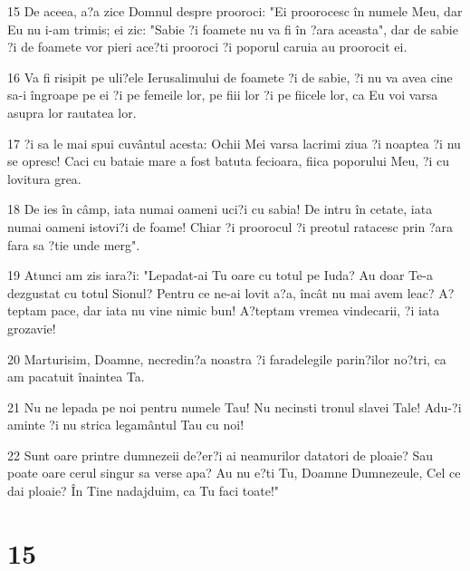 \par 15 De aceea, a?a zice Domnul despre prooroci: "Ei proorocesc în numele Meu, dar Eu nu i-am trimis; ei zic: "Sabie ?i foamete nu va fi în ?ara aceasta", dar de sabie ?i de foamete vor pieri ace?ti prooroci ?i poporul caruia au proorocit ei.
\par 16 Va fi risipit pe uli?ele Ierusalimului de foamete ?i de sabie, ?i nu va avea cine sa-i îngroape pe ei ?i pe femeile lor, pe fiii lor ?i pe fiicele lor, ca Eu voi varsa asupra lor rautatea lor.
\par 17 ?i sa le mai spui cuvântul acesta: Ochii Mei varsa lacrimi ziua ?i noaptea ?i nu se opresc! Caci cu bataie mare a fost batuta fecioara, fiica poporului Meu, ?i cu lovitura grea.
\par 18 De ies în câmp, iata numai oameni uci?i cu sabia! De intru în cetate, iata numai oameni istovi?i de foame! Chiar ?i proorocul ?i preotul ratacesc prin ?ara fara sa ?tie unde merg".
\par 19 Atunci am zis iara?i: "Lepadat-ai Tu oare cu totul pe Iuda? Au doar Te-a dezgustat cu totul Sionul? Pentru ce ne-ai lovit a?a, încât nu mai avem leac? A?teptam pace, dar iata nu vine nimic bun! A?teptam vremea vindecarii, ?i iata grozavie!
\par 20 Marturisim, Doamne, necredin?a noastra ?i faradelegile parin?ilor no?tri, ca am pacatuit înaintea Ta.
\par 21 Nu ne lepada pe noi pentru numele Tau! Nu necinsti tronul slavei Tale! Adu-?i aminte ?i nu strica legamântul Tau cu noi!
\par 22 Sunt oare printre dumnezeii de?er?i ai neamurilor datatori de ploaie? Sau poate oare cerul singur sa verse apa? Au nu e?ti Tu, Doamne Dumnezeule, Cel ce dai ploaie? În Tine nadajduim, ca Tu faci toate!"

\chapter{15}

